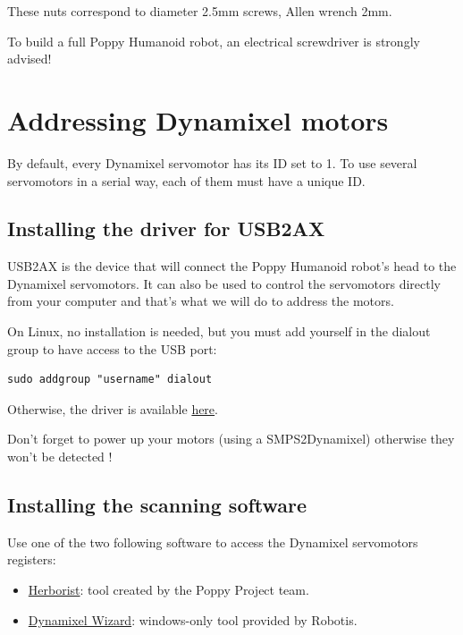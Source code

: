 \documentclass[includefoot]{article}
\begin{document}
 These nuts correspond to diameter 2.5mm screws, Allen wrench 2mm.
 
 To build a full Poppy Humanoid robot, an electrical screwdriver is strongly advised!




\section{Addressing Dynamixel motors}
\label{addressing-poppys-motors}

By default, every Dynamixel servomotor has its ID set to 1. To use several servomotors in a serial way, each of them must have a unique ID.

\subsection{Installing the driver for USB2AX}

USB2AX is the device that will connect the Poppy Humanoid robot's head to the Dynamixel servomotors. It can also be used to control the servomotors directly from your computer and that's what we will do to address the motors.

On Linux, no installation is needed, but you must add yourself in the dialout group to have access to the USB port:
 \begin{verbatim}
sudo addgroup "username" dialout
\end{verbatim}

Otherwise, the driver is available \href{http://www.xevelabs.com/doku.php?id=product:usb2ax:quickstart}{here}.

Don't forget to power up your motors (using a SMPS2Dynamixel) otherwise they won't be detected !

\subsection{Installing the scanning software}

Use one of the two following software to access the Dynamixel servomotors registers:

\begin{itemize}
\item \href{http://poppy-project.github.io/pypot/herborist.html}{Herborist}: tool created by the Poppy Project team. 
\item \href{http://support.robotis.com/en/software/roboplus/dynamixel_monitor/quickstart/dynamixel\_monitor\_connection.htm}{Dynamixel Wizard}: windows-only tool provided by Robotis.
\end{itemize}
\end{document}
